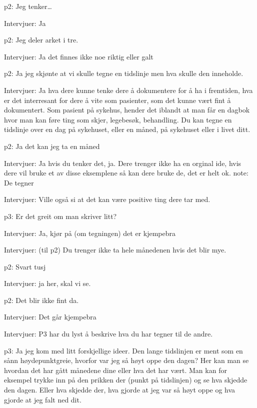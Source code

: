 \documentclass[11pt,UKenglish, a4paper]{article}
\begin{document}
\textcolor{myYellow} {p2:} Jeg tenker\dots

\textcolor{myBlue} {Intervjuer:} Ja

\textcolor{myYellow} {p2:} Jeg deler arket i tre.

\textcolor{myBlue} {Intervjuer:} Ja det finnes ikke noe riktig eller galt 

\textcolor{myYellow} {p2:} Ja jeg skjønte at vi skulle tegne en tidslinje men hva skulle den inneholde.

\textcolor{myBlue} {Intervjuer:} Ja hva dere kunne tenke dere å dokumentere for å ha i fremtiden, hva er det interresant for dere å vite som pasienter, som det kunne vært fint å dokumentert. Som pasient på sykehus, hender det iblandt at man får en dagbok hvor man kan føre ting som skjer, legebesøk, behandling. Du kan tegne en tidslinje over en dag på sykehuset, eller en måned, på sykehuset eller i livet ditt.

\textcolor{myYellow} {p2:} Ja det kan jeg ta en måned

\textcolor{myBlue} {Intervjuer:} Ja hvis du tenker det, ja. Dere trenger ikke ha en orginal ide, hvis dere vil bruke et av disse eksemplene så kan dere bruke de, det er helt ok.
note: De tegner

\textcolor{myBlue} {Intervjuer:} Ville også si at det kan være positive ting dere tar med.

\textcolor{myR} {p3:} Er det greit om man skriver litt?

\textcolor{myBlue} {Intervjuer:} Ja, kjør på (om tegningen) det er kjempebra

\textcolor{myBlue} {Intervjuer:} (til p2) Du trenger ikke ta hele månedenen hvis det blir mye.

\textcolor{myYellow} {p2:} Svart tusj

\textcolor{myBlue} {Intervjuer:} ja her, skal vi se.

\textcolor{myYellow} {p2:} Det blir ikke fint da. 

\textcolor{myBlue} {Intervjuer:} Det går kjempebra

\textcolor{myBlue} {Intervjuer:} P3 har du lyst å beskrive hva du har tegner til de andre.

\textcolor{myR} {p3:} Ja jeg kom med litt forskjellige ideer. Den lange tidslinjen er ment som en sånn høydepunktgreie, hvorfor var jeg så høyt oppe den dagen? Her kan man se hvordan det har gått månedene dine eller hva det har vært. Man kan for eksempel trykke inn på den prikken der (punkt på tidslinjen) og se hva skjedde den dagen. Eller hva skjedde der, hva gjorde at jeg var så høyt oppe og hva gjorde at jeg falt ned dit.
\end{document}
